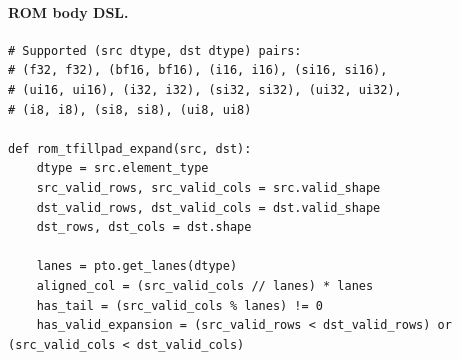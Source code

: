 \paragraph{ROM body DSL.}
\begin{lstlisting}[style=ptocode]
# Supported (src dtype, dst dtype) pairs:
# (f32, f32), (bf16, bf16), (i16, i16), (si16, si16),
# (ui16, ui16), (i32, i32), (si32, si32), (ui32, ui32),
# (i8, i8), (si8, si8), (ui8, ui8)

def rom_tfillpad_expand(src, dst):
    dtype = src.element_type
    src_valid_rows, src_valid_cols = src.valid_shape
    dst_valid_rows, dst_valid_cols = dst.valid_shape
    dst_rows, dst_cols = dst.shape

    lanes = pto.get_lanes(dtype)
    aligned_col = (src_valid_cols // lanes) * lanes
    has_tail = (src_valid_cols % lanes) != 0
    has_valid_expansion = (src_valid_rows < dst_valid_rows) or (src_valid_cols < dst_valid_cols)


\end{lstlisting}
